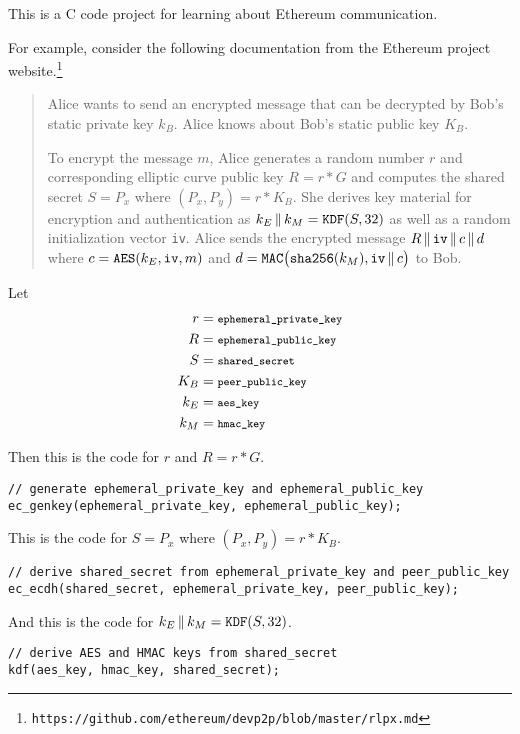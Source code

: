 \documentclass[12pt]{article}
\begin{document}
This is a C code project for learning about Ethereum communication.

\bigskip
For example, consider the following documentation
from the Ethereum project website.\footnote{\tt https://github.com/ethereum/devp2p/blob/master/rlpx.md}

\begin{quote}
Alice wants to send an encrypted message that can be decrypted by Bob's static private key $k_B$.
Alice knows about Bob's static public key $K_B$.

\medskip
To encrypt the message $m$, Alice generates a random number $r$
and corresponding elliptic curve public key $R=r*G$ and computes the
shared secret $S=P_x$ where $(P_x,P_y)=r*K_B$.
She derives key material for encryption and authentication as
$k_E\,\|\,k_M=\text{\tt KDF}(S,32)$
as well as a random initialization vector \verb$iv$.
Alice sends the encrypted message $R\,\|\,\text{\tt iv}\,\|\,c\,\|\,d$
where $c=\text{\tt AES}(k_E,\text{\tt iv},m)$
and $d=\text{\tt MAC}\big(\text{\tt sha256}(k_M),\text{\tt iv}\,\|\,c\big)$ to Bob.
\end{quote}

Let
\begin{align*}
r&=\text{\footnotesize\tt ephemeral\_private\_key}
\\
R&=\text{\footnotesize\tt ephemeral\_public\_key}
\\
S&=\text{\footnotesize\tt shared\_secret}
\\
K_B&=\text{\footnotesize\tt peer\_public\_key}
\\
k_E&=\text{\footnotesize\tt aes\_key}
\\
k_M&=\text{\footnotesize\tt hmac\_key}
\end{align*}

Then this is the code for $r$ and $R=r*G$.
{\footnotesize
\begin{verbatim}
// generate ephemeral_private_key and ephemeral_public_key
ec_genkey(ephemeral_private_key, ephemeral_public_key);
\end{verbatim}
}

\bigskip
This is the code for $S=P_x$ where $(P_x,P_y)=r*K_B$.
{\footnotesize
\begin{verbatim}
// derive shared_secret from ephemeral_private_key and peer_public_key
ec_ecdh(shared_secret, ephemeral_private_key, peer_public_key);
\end{verbatim}
}

\bigskip
And this is the code for $k_E\,\|\,k_M=\text{\tt KDF}(S,32)$.
{\footnotesize
\begin{verbatim}
// derive AES and HMAC keys from shared_secret
kdf(aes_key, hmac_key, shared_secret);
\end{verbatim}
}
\end{document}
